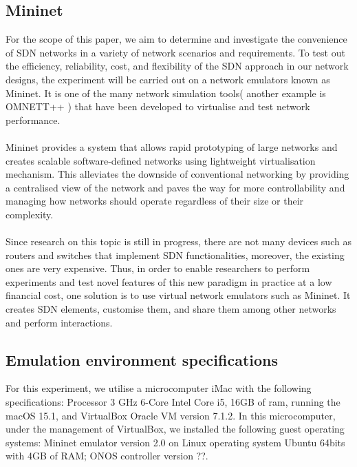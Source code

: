 \documentclass{article}
\begin{document}
\subsection{Mininet}
For the scope of this paper, we aim to determine and investigate the convenience of SDN networks in a variety of network scenarios and requirements. To test out the efficiency, reliability, cost, and flexibility of the SDN approach in our network designs, the experiment will be carried out on a network emulators known as Mininet. It is one of the many network simulation tools( another example is OMNETT++ ) that have been developed to virtualise and test network performance\cite{10220519, Haji_Zeebaree_Saeed_Ameen_Shukur_Omar_Sadeeq_Ageed_Ibrahim_Yasin_2021}. \\\\ Mininet\cite{6860404} provides a system that allows rapid prototyping of large networks and creates scalable software-defined networks using lightweight virtualisation mechanism. This alleviates the downside of conventional networking by providing a centralised view of the network and paves the way for more controllability and managing how networks should operate regardless of their size or their complexity. \\\\
Since research on this topic is still in progress, there are not many devices such as routers and switches that implement SDN functionalities, moreover, the existing ones are very expensive. Thus, in order to enable researchers to perform experiments and test novel features of this new paradigm in practice at a low financial cost, one solution is to use virtual network emulators such as Mininet. It creates SDN elements, customise them, and share them among other networks and perform interactions\cite{6860404}.
\newpage
\subsection{Emulation environment specifications}
For this experiment, we utilise a microcomputer iMac with the following specifications: Processor 3 GHz 6-Core Intel Core i5, 16GB of ram, running the macOS 15.1, and VirtualBox Oracle VM version 7.1.2.
In this microcomputer, under the management of VirtualBox, we installed the following guest operating systems: Mininet emulator version 2.0 on Linux operating system Ubuntu 64bits with 4GB of RAM; ONOS controller version ??.
\end{document}
